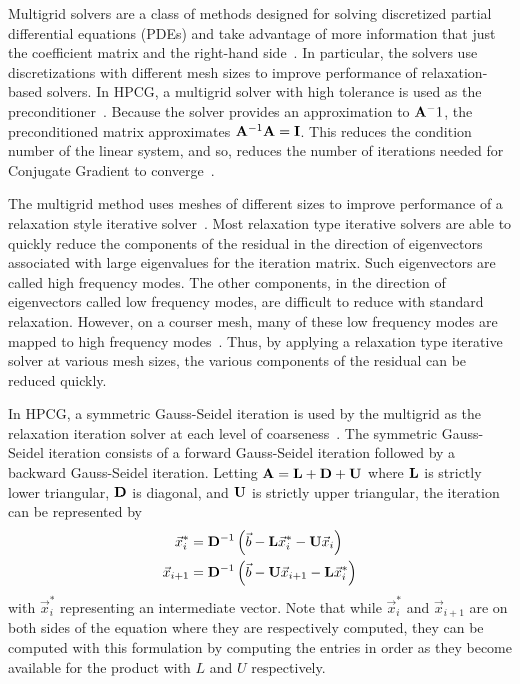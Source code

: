 Multigrid solvers are a class of methods designed for solving discretized partial differential equations (PDEs) and take advantage of more information that just the coefficient matrix and the right-hand side~\cite{Saad:2003:IterativeMethods}.
In particular, the solvers use discretizations with different mesh sizes to improve performance of relaxation-based solvers.
In HPCG, a multigrid solver with high tolerance is used as the preconditioner~\cite{Dongarra:2015:HPCG}.
Because the solver provides an approximation to \(\mathbf{A}^-1\), the preconditioned matrix approximates \(\mathbf{A}^{-1}\mathbf{A} = \mathbf{I}\).
This reduces the condition number of the linear system, and so, reduces the number of iterations needed for Conjugate Gradient to converge~\cite{Saad:2003:IterativeMethods}.

The multigrid method uses meshes of different sizes to improve performance of a relaxation style iterative solver~\cite{Saad:2003:IterativeMethods}.
Most relaxation type iterative solvers are able to quickly reduce the components of the residual in the direction of eigenvectors associated with large eigenvalues for the iteration matrix.
Such eigenvectors are called high frequency modes.
The other components, in the direction of eigenvectors called low frequency modes, are difficult to reduce with standard relaxation.
However, on a courser mesh, many of these low frequency modes are mapped to high frequency modes~\cite{Saad:2003:IterativeMethods}.
Thus, by applying a relaxation type iterative solver at various mesh sizes, the various components of the residual can be reduced quickly.

In HPCG, a symmetric Gauss-Seidel iteration is used by the multigrid as the relaxation iteration solver at each level of coarseness~\cite{Dongarra:2015:HPCG}.
The symmetric Gauss-Seidel iteration consists of a forward Gauss-Seidel iteration followed by a backward Gauss-Seidel iteration.
Letting \(\mathbf{A} = \mathbf{L}+\mathbf{D}+\mathbf{U}\) where \(\mathbf{L}\) is strictly lower triangular, \(\mathbf{D}\) is diagonal, and \(\mathbf{U}\) is strictly upper triangular, the iteration can be represented by
\begin{align*}
	\vec{x}^*_i   &= \mathbf{D}^{-1}\left(\vec{b} - \mathbf{L}\vec{x}^*_i - \mathbf{U}\vec{x}_i\right) \\
	\vec{x}_{i+1} &= \mathbf{D}^{-1}\left(\vec{b} - \mathbf{U}\vec{x}_{i+1} - \mathbf{L}\vec{x}^*_i\right)
\end{align*}
with \(\vec{x}_i^*\) representing an intermediate vector.
Note that while \(\vec{x}^*_i\) and \(\vec{x}_{i+1}\) are on both sides of the equation where they are respectively computed, they can be computed with this formulation by computing the entries in order as they become available for the product with \(L\) and \(U\) respectively.
